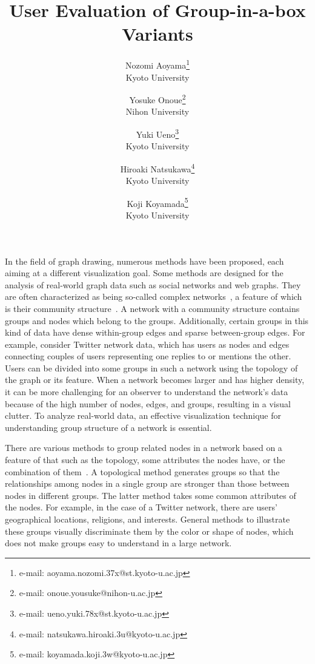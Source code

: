 \documentclass[review]{vgtc}                 %
\title{User Evaluation of Group-in-a-box Variants}
\author{Nozomi Aoyama\thanks{e-mail: aoyama.nozomi.37x@st.kyoto-u.ac.jp}\\ %
        \scriptsize Kyoto University %
\and Yosuke Onoue\thanks{e-mail: onoue.yousuke@nihon-u.ac.jp}\\ %
     \scriptsize Nihon University %
\and Yuki Ueno\thanks{e-mail: ueno.yuki.78x@st.kyoto-u.ac.jp}\\ %
     \scriptsize \centering Kyoto University
\and Hiroaki Natsukawa\thanks{e-mail: natsukawa.hiroaki.3u@kyoto-u.ac.jp}\\ %
     \scriptsize Kyoto University
\and Koji Koyamada\thanks{e-mail: koyamada.koji.3w@kyoto-u.ac.jp}\\ %
     \scriptsize Kyoto University}
\begin{document}


\maketitle

In the field of graph drawing, numerous methods have been proposed, each aiming at a different visualization goal.
Some methods are designed for the analysis of real-world graph data such as social networks and web graphs.
They are often characterized as being so-called complex networks~\cite{Newman:2010:NI:1809753}, a feature of which is their community structure~\cite{girvan2002community,newman2004detecting}.
A network with a community structure contains groups and nodes which belong to the groups.
Additionally, certain groups in this kind of data have dense within-group edges and sparse between-group edges.
For example, consider Twitter network data, which has users as nodes and edges connecting couples of users representing one replies to or mentions the other.
Users can be divided into some groups in such a network using the topology of the graph or its feature.
When a network becomes larger and has higher density, it can be more challenging for an observer to understand the network’s data because of the high number of nodes, edges, and groups, resulting in a visual clutter.
To analyze real-world data, an effective visualization technique for understanding group structure of a network is essential.

There are various methods to group related nodes in a network based on a feature of that such as the topology, some attributes the nodes have, or the combination of them~\cite{clauset2004finding,wakita2007finding,lloyd1982least,navlakha2009finding}.
A topological method generates groups so that the relationships among nodes in a single group are stronger than those between nodes in different groups.
The latter method takes some common attributes of the nodes. For example, in the case of a Twitter network, there are users' geographical locations, religions, and interests.
General methods to illustrate these groups visually discriminate them by the color or shape of nodes, which does not make groups easy to understand in a large network.
\end{document}

